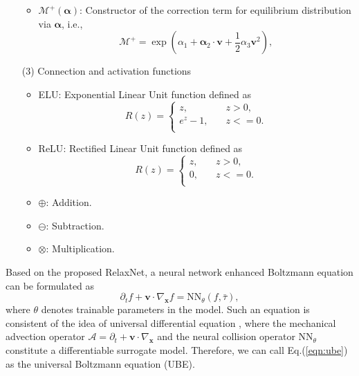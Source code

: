 \documentclass[preprint,3p,12pt,sort&compress]{elsarticle}
\begin{document}
\begin{enumerate}
\begin{itemize}
        \item{$\mathcal M^+(\boldsymbol\alpha)$}: Constructor of the correction term for equilibrium distribution via $\boldsymbol\alpha$, i.e.,
        \begin{equation}
            \mathcal M^+ = \exp \left(\alpha_1 + \boldsymbol\alpha_2 \cdot \mathbf v+\frac{1}{2}\alpha_3 \mathbf v^2\right),
            \label{eqn:maxwellian plus}
        \end{equation}
    \end{itemize}
    \item[(3)] Connection and activation functions
    \begin{itemize}
        \item{ELU}: Exponential Linear Unit function defined as
        \begin{equation}
            R(z)=\left\{\begin{array}{cc}
            z,  \quad & z>0, \\
            e^z-1, \quad & z<=0. \\
            \end{array}\right.
        \end{equation}
        \item{ReLU}: Rectified Linear Unit function defined as
        \begin{equation}
            R(z)=\left\{\begin{array}{cc}
            z,  \quad & z>0, \\
            0, \quad & z<=0. \\
            \end{array}\right.
        \end{equation}
        \item{$\oplus$}: Addition.
        \item{$\ominus$}: Subtraction.
        \item{$\otimes$}: Multiplication.
    \end{itemize}
\end{enumerate}

Based on the proposed RelaxNet, a neural network enhanced Boltzmann equation can be formulated as
\begin{equation}
    \partial_t f + \mathbf v \cdot \nabla_{\mathbf x} f = \mathrm{NN}_\theta (f,\bar\tau),
    \label{eqn:ube}
\end{equation}
where $\theta$ denotes trainable parameters in the model.
Such an equation is consistent of the idea of universal differential equation \cite{rackauckas2020universal}, where the mechanical advection operator $\mathcal A = \partial_t + \mathbf v \cdot \nabla_{\mathbf x}$ and the neural collision operator $\mathrm{NN}_\theta$ constitute a differentiable surrogate model.
Therefore, we can call Eq.(\ref{eqn:ube}) as the universal Boltzmann equation (UBE).
\end{document}
